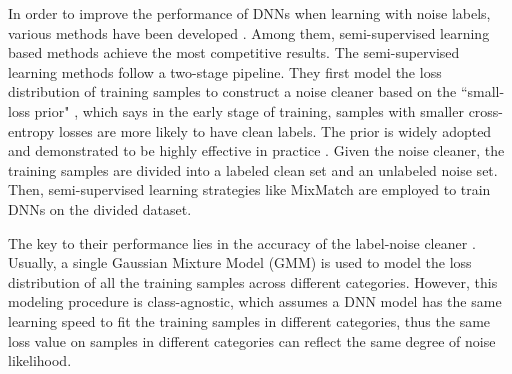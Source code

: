 \documentclass{article} \usepackage{iclr2023_conference,times}
\begin{document}
In order to improve the performance of DNNs when learning with noise labels, various methods have been developed \citep{liu2020early, Li2020DivideMixLW, reed2014training, nishi2021augmentation}. Among them, semi-supervised learning based methods \citep{nishi2021augmentation,Li2020DivideMixLW} achieve the most competitive results. The semi-supervised   learning methods  follow a two-stage   pipeline. They first model the  loss distribution of training samples to construct a noise cleaner based on the ``small-loss prior" \citep{han2020survey}, which says in the early stage of training, samples with smaller cross-entropy losses are more likely to have clean labels. The prior is widely adopted and demonstrated to be highly effective in practice \citep{han2020survey}. Given the noise cleaner, the training samples are divided into a labeled clean set and an unlabeled noise set. Then, semi-supervised learning strategies like MixMatch \citep{berthelot2019mixmatch} are employed to train DNNs on the divided dataset. 

The key to their performance lies in the accuracy of the label-noise cleaner \citep{cordeiro2022longremix}. Usually, a single Gaussian Mixture Model (GMM) \citep{Li2020DivideMixLW} is used  to model the   loss distribution of all the training samples across different categories. However, this modeling procedure is class-agnostic, which assumes a DNN model has the same learning speed to fit the training samples in different categories, thus the same loss value on samples in different categories can reflect the same degree of noise likelihood.
\end{document}
